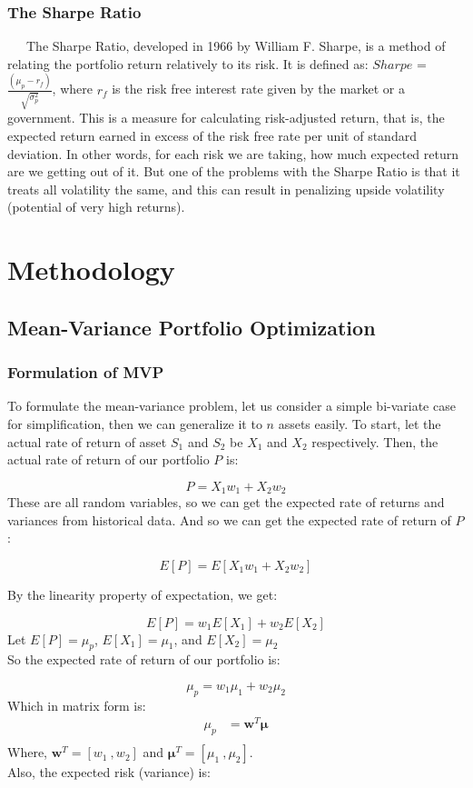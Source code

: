 \documentclass[12pt,titlepage,a4paper]{article}
\begin{document}
\subsubsection{The Sharpe Ratio}
\ \ \  The Sharpe Ratio, developed in 1966 by William F. Sharpe, is a method of relating the portfolio return relatively to its risk. It is defined as: $Sharpe$ = $\frac{(\mu_p - r_f)}{\sqrt{\sigma_p^2}}$, where $r_f$ is the risk free interest rate given by the market or a government.  This is a measure for calculating risk-adjusted return, that is, the expected return earned in excess of the risk free rate per unit of standard deviation. In other words, for each risk we are taking, how much expected return are we getting out of it. But one of the problems with the Sharpe Ratio is that it treats all volatility the same, and this can result in penalizing upside volatility (potential of very high returns).\\

\section{Methodology}
\subsection{Mean-Variance Portfolio Optimization}
\subsubsection{Formulation of MVP}

To formulate the mean-variance problem, let us consider a simple bi-variate case for simplification, then we can generalize it to $n$ assets easily. To start, let the actual rate of return of asset $S_1$ and $S_2$ be $X_1$ and $X_2$ respectively. Then, the actual rate of return of our portfolio $P$ is:

$$
P = X_1w_1 + X_2w_2
$$
These are all random variables, so we can get the expected rate of returns and variances from historical data. And so we can get the expected rate of return of $P$: 

$$
E[P] = E[X_1w_1 + X_2w_2]
$$

By the linearity property of expectation, we get: 

$$
E[P] = w_1E[X_1] + w_2E[X_2]
$$
Let $E[P] = \mu_p$, $E[X_1] = \mu_1$, and $E[X_2]=\mu_2$ \\
So the expected rate of return of our portfolio is: 

$$
\mu_p = w_1 \mu_1 + w_2 \mu_2
$$
Which in matrix form is:
\begin{align*}
	\mu_p &= \mathbf{w}^T\pmb{\mu} \\
\end{align*}
Where,  $\mathbf{w}^T = [ w_1\ ,  w_2 ]$ and  $\pmb{\mu}^T = [ \mu_1\ , \mu_2 ]$. 
\\
Also, the expected risk (variance) is: 
\end{document}
